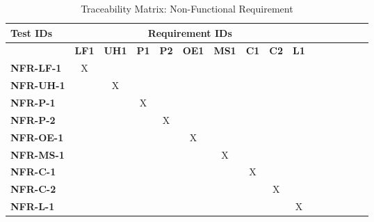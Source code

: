 \documentclass[12pt, titlepage]{article}
\begin{document}
\begin{table}[H]
    \centering
    \caption{Traceability Matrix: Non-Functional Requirement}
    \begin{adjustbox}{max width=0.7\paperwidth}
    \begin{tabular}{l|ccccccccccccccc}
        \textbf{Test IDs} & \multicolumn{9}{c}{\textbf{Requirement IDs}}\\
        \hline
        ~ & \textbf{LF1} & \textbf{UH1} & \textbf{P1} & \textbf{P2} & \textbf{OE1}
        & \textbf{MS1} & \textbf{C1} & \textbf{C2} & \textbf{L1}\\
        \textbf{NFR-LF-1}  & X & ~ & ~ & ~ & ~ & ~ & ~ & ~ & ~\\
        \textbf{NFR-UH-1}  & ~ & X & ~ & ~ & ~ & ~ & ~ & ~ & ~\\
        \textbf{NFR-P-1}   & ~ & ~ & X & ~ & ~ & ~ & ~ & ~ & ~\\
        \textbf{NFR-P-2}   & ~ & ~ & ~ & X & ~ & ~ & ~ & ~ & ~\\
        \textbf{NFR-OE-1}  & ~ & ~ & ~ & ~ & X & ~ & ~ & ~ & ~\\
        \textbf{NFR-MS-1}  & ~ & ~ & ~ & ~ & ~ & X & ~ & ~ & ~\\
        \textbf{NFR-C-1}   & ~ & ~ & ~ & ~ & ~ & ~ & X & ~ & ~\\
        \textbf{NFR-C-2}   & ~ & ~ & ~ & ~ & ~ & ~ & ~ & X & ~\\
        \textbf{NFR-L-1}   & ~ & ~ & ~ & ~ & ~ & ~ & ~ & ~ & X\\
    \end{tabular}
    \end{adjustbox}
    \label{Traceability Matrix: Non-Functional Requirement}
\end{table}

\newpage
\end{document}
